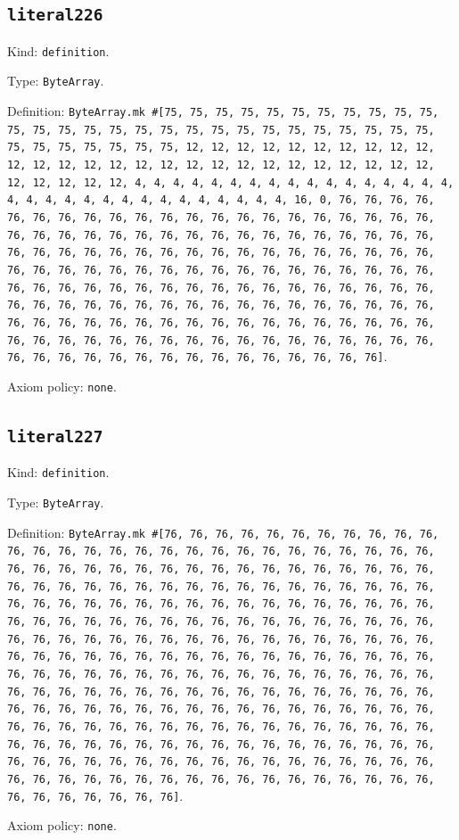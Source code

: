 \documentclass[11pt]{article}
\begin{document}
\subsection*{\texttt{literal226}}
\noindent Kind: \texttt{definition}.\par
\noindent Type: \texttt{ByteArray}.\par
\noindent Definition: \texttt{ByteArray.mk \#[75, 75, 75, 75, 75, 75, 75, 75, 75, 75, 75, 75, 75, 75, 75, 75, 75, 75, 75, 75, 75, 75, 75, 75, 75, 75, 75, 75, 75, 75, 75, 75, 75, 75, 75, 12, 12, 12, 12, 12, 12, 12, 12, 12, 12, 12, 12, 12, 12, 12, 12, 12, 12, 12, 12, 12, 12, 12, 12, 12, 12, 12, 12, 12, 12, 12, 12, 4, 4, 4, 4, 4, 4, 4, 4, 4, 4, 4, 4, 4, 4, 4, 4, 4, 4, 4, 4, 4, 4, 4, 4, 4, 4, 4, 4, 4, 4, 4, 4, 16, 0, 76, 76, 76, 76, 76, 76, 76, 76, 76, 76, 76, 76, 76, 76, 76, 76, 76, 76, 76, 76, 76, 76, 76, 76, 76, 76, 76, 76, 76, 76, 76, 76, 76, 76, 76, 76, 76, 76, 76, 76, 76, 76, 76, 76, 76, 76, 76, 76, 76, 76, 76, 76, 76, 76, 76, 76, 76, 76, 76, 76, 76, 76, 76, 76, 76, 76, 76, 76, 76, 76, 76, 76, 76, 76, 76, 76, 76, 76, 76, 76, 76, 76, 76, 76, 76, 76, 76, 76, 76, 76, 76, 76, 76, 76, 76, 76, 76, 76, 76, 76, 76, 76, 76, 76, 76, 76, 76, 76, 76, 76, 76, 76, 76, 76, 76, 76, 76, 76, 76, 76, 76, 76, 76, 76, 76, 76, 76, 76, 76, 76, 76, 76, 76, 76, 76, 76, 76, 76, 76, 76, 76, 76, 76, 76, 76, 76, 76, 76, 76, 76, 76, 76, 76, 76, 76]}.\par
\noindent Axiom policy: \texttt{none}.\par
\subsection*{\texttt{literal227}}
\noindent Kind: \texttt{definition}.\par
\noindent Type: \texttt{ByteArray}.\par
\noindent Definition: \texttt{ByteArray.mk \#[76, 76, 76, 76, 76, 76, 76, 76, 76, 76, 76, 76, 76, 76, 76, 76, 76, 76, 76, 76, 76, 76, 76, 76, 76, 76, 76, 76, 76, 76, 76, 76, 76, 76, 76, 76, 76, 76, 76, 76, 76, 76, 76, 76, 76, 76, 76, 76, 76, 76, 76, 76, 76, 76, 76, 76, 76, 76, 76, 76, 76, 76, 76, 76, 76, 76, 76, 76, 76, 76, 76, 76, 76, 76, 76, 76, 76, 76, 76, 76, 76, 76, 76, 76, 76, 76, 76, 76, 76, 76, 76, 76, 76, 76, 76, 76, 76, 76, 76, 76, 76, 76, 76, 76, 76, 76, 76, 76, 76, 76, 76, 76, 76, 76, 76, 76, 76, 76, 76, 76, 76, 76, 76, 76, 76, 76, 76, 76, 76, 76, 76, 76, 76, 76, 76, 76, 76, 76, 76, 76, 76, 76, 76, 76, 76, 76, 76, 76, 76, 76, 76, 76, 76, 76, 76, 76, 76, 76, 76, 76, 76, 76, 76, 76, 76, 76, 76, 76, 76, 76, 76, 76, 76, 76, 76, 76, 76, 76, 76, 76, 76, 76, 76, 76, 76, 76, 76, 76, 76, 76, 76, 76, 76, 76, 76, 76, 76, 76, 76, 76, 76, 76, 76, 76, 76, 76, 76, 76, 76, 76, 76, 76, 76, 76, 76, 76, 76, 76, 76, 76, 76, 76, 76, 76, 76, 76, 76, 76, 76, 76, 76, 76, 76, 76, 76, 76, 76, 76, 76, 76, 76, 76, 76, 76, 76, 76, 76, 76, 76, 76, 76, 76, 76, 76, 76, 76]}.\par
\noindent Axiom policy: \texttt{none}.\par
\end{document}
